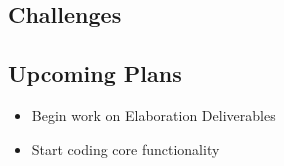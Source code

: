 \documentclass[11pt]{article}
\begin{document}
\subsection{Challenges} %

\subsection{Upcoming Plans}
\begin{itemize}
\item Begin work on Elaboration Deliverables
\item Start coding core functionality
\end{itemize}
\end{document}
